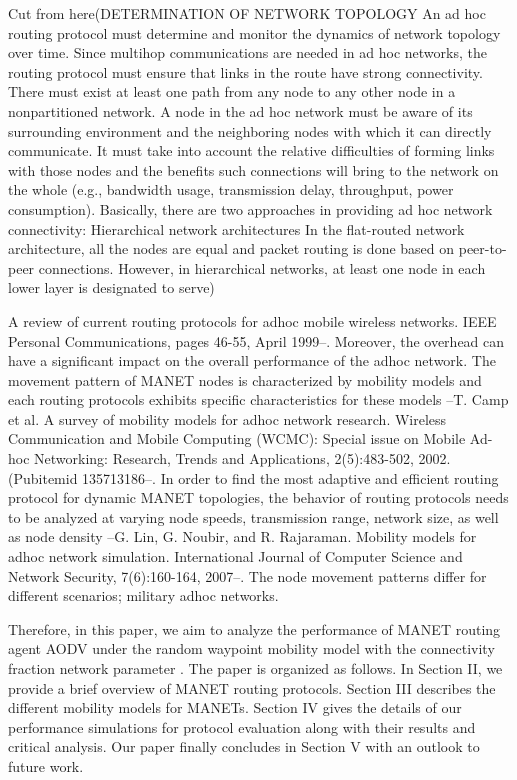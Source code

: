 \documentclass[letterpaper, 10 pt, conference]{ieeeconf}  %
\begin{document}
Cut from here(DETERMINATION OF NETWORK TOPOLOGY
An ad hoc routing protocol must determine and
monitor the dynamics of network topology over
time. Since multihop communications are needed
in ad hoc networks, the routing protocol must
ensure that links in the route have strong connectivity.
There must exist at least one path from
any node to any other node in a nonpartitioned
network. A node in the ad hoc network must be
aware of its surrounding environment and the
neighboring nodes with which it can directly
communicate. It must take into account the relative
difficulties of forming links with those nodes
and the benefits such connections will bring to
the network on the whole (e.g., bandwidth usage,
transmission delay, throughput, power consumption).
Basically, there are two approaches in providing
ad hoc network connectivity:
Hierarchical network architectures 
In the flat-routed network architecture, all the
nodes are equal and packet routing is done
based on peer-to-peer connections. However, in
hierarchical networks, at least one node in each
lower layer is designated to serve)


A review of current routing protocols for adhoc mobile wireless networks. IEEE Personal Communications, pages 46-55, April 1999--. Moreover, the overhead can have a significant impact on the overall
performance of the adhoc network. The movement pattern of MANET nodes is characterized by mobility models and each routing protocols exhibits specific
characteristics for these models --T. Camp et al. A survey of mobility models for adhoc network research. Wireless Communication and Mobile Computing (WCMC): Special issue on Mobile Ad-hoc Networking: Research, Trends and Applications, 2(5):483-502, 2002. (Pubitemid 135713186--. In order to find the most adaptive and efficient routing protocol for dynamic MANET topologies, the behavior of routing protocols needs to be
analyzed at varying node speeds, transmission range, network size, as well as node density --G. Lin, G. Noubir, and R. Rajaraman. Mobility models for adhoc network simulation. International Journal of Computer Science and Network Security, 7(6):160-164, 2007--. The node movement patterns differ for different scenarios; military adhoc networks.

Therefore, in this paper, we aim to analyze the performance of MANET routing agent AODV under the random waypoint  mobility model with the connectivity fraction network parameter . The paper is organized as follows. In Section II, we provide a brief overview of MANET routing protocols. Section III describes the different mobility models for MANETs. Section IV gives the details of our performance simulations for protocol evaluation along with their results and critical analysis. Our paper finally concludes in Section V with an outlook to future work.
\end{document}
